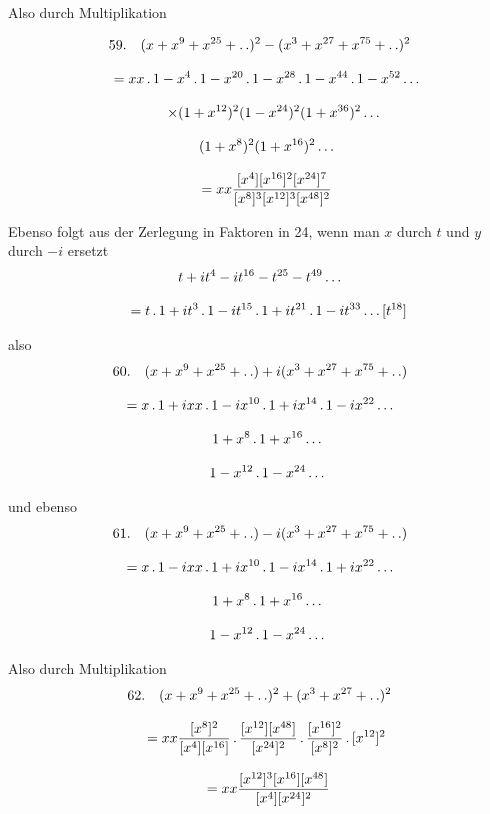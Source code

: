 \begingroup
\renewcommand{\arraystretch}{1.45}

Also durch Multiplikation

\[
\begin{gathered}
59.\quad{}
(x+x^9+x^{25}+ .\,. )^2-(x^3+x^{27}+x^{75}+ .\,. )^2\\[8pt]
\quad=xx\,.\,1-x^4\,.\,1-x^{20}\,.\,1-x^{28}\,.\,1-x^{44}\,.\,1-x^{52}\mathinner{.\,.\,.}\\[8pt]
\qquad\times(1+x^{12})^2(1-x^{24})^2(1+x^{36})^2\mathinner{.\,.\,.}\\[8pt]\quad{}(1+x^8)^2(1+x^{16})^2\mathinner{.\,.\,.}\\[8pt]
\quad=xx\frac{[x^4][x^{16}]^2[x^{24}]^7}{[x^8]^3[x^{12}]^3[x^{48}]^2}
\end{gathered}
\]


Ebenso folgt aus der Zerlegung in Faktoren in 24, wenn man \(x\) durch \(t\) und
\(y\) durch \(-i\) ersetzt
\[
\begin{gathered}t+it^4-it^{16}-t^{25}-t^{49}\mathinner{.\,.\,.}\\[8pt]\quad{}=t\,.\,1+it^3\,.\,1-it^{15}\,.\,1+it^{21}\,.\,1-it^{33}\mathinner{.\,.\,.}[t^{18}]\end{gathered}
\]

also
\[
\begin{gathered}
60.\quad{}
(x+x^9+x^{25}+\mathinner{.\,.})+i(x^3+x^{27}+x^{75}+\mathinner{.\,.})\\[8pt]
=x\,.\,1+ixx\,.\,1-ix^{10}\,.\,1+ix^{14}\,.\,1-ix^{22}\mathinner{.\,.\,.}\\[8pt]\quad{}1+x^8\,.\,1+x^{16}\mathinner{.\,.\,.}\\[8pt]\quad{}1-x^{12}\,.\,1-x^{24}\mathinner{.\,.\,.}
\end{gathered}
\]


und ebenso
\[
\begin{gathered}
61.\quad{}
(x+x^9+x^{25}+\mathinner{.\,.})-i(x^3+x^{27}+x^{75}+\mathinner{.\,.})\\[8pt]
=x\,.\,1-ixx\,.\,1+ix^{10}\,.\,1-ix^{14}\,.\,1+ix^{22}\mathinner{.\,.\,.}\\[8pt]\quad{}1+x^8\,.\,1+x^{16}\mathinner{.\,.\,.}\\[8pt]\quad{}1-x^{12}\,.\,1-x^{24}\mathinner{.\,.\,.}
\end{gathered}
\]


Also durch Multiplikation
\[
\begin{gathered}
62.\quad{}
(x+x^9+x^{25}+\mathinner{.\,.})^2+(x^3+x^{27}+ .\,. )^2\\[8pt]
\quad=xx\frac{[x^8]^2}{[x^4][x^{16}]}\,.\,\frac{[x^{12}][x^{48}]}{[x^{24}]^2}\,.\,\frac{[x^{16}]^2}{[x^8]^2}\,.\,[x^{12}]^2
\\[8pt]\quad{}=xx\frac{[x^{12}]^3[x^{16}][x^{48}]}{[x^4][x^{24}]^2}
\end{gathered}
\]


